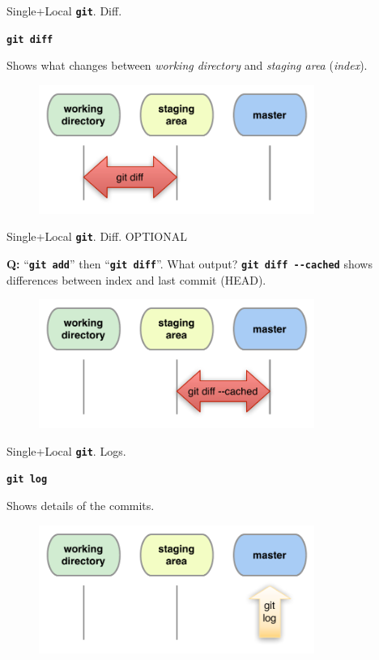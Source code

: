 \documentclass{beamer}
\newcommand{\git}{\texttt{\textbf{git}}\xspace}
\begin{document}
\begin{frame}{Single+Local \git. Diff.}
  \begin{center}
    \texttt{\textbf{git diff}}
  \end{center}
  Shows what changes between \emph{working directory} and
  \emph{staging area} (\emph{index}).
  \begin{figure}
    \centering
    \includegraphics[width=9cm]{figs/local-diff}
  \end{figure}
\end{frame}

\begin{frame}{Single+Local \git. Diff. \alert{OPTIONAL}}
  \begin{block}{\textbf{Q:} ``\texttt{\textbf{git add}}'' then
      ``\texttt{\textbf{git diff}}''. What output?}
    \texttt{\textbf{git diff -{}-cached}} shows differences between
    index and last commit (\alert{HEAD}).
  \end{block}
  \begin{figure}
    \centering
    \includegraphics[width=9cm]{figs/local-diff-cached}
  \end{figure}
\end{frame}


\begin{frame}{Single+Local \git. Logs.}
  \begin{center}
    \texttt{\textbf{git log}}
  \end{center}
  Shows details of the commits.
  \begin{figure}
    \centering
    \includegraphics[width=9cm]{figs/local-log}
  \end{figure}
\end{frame}
\end{document}
